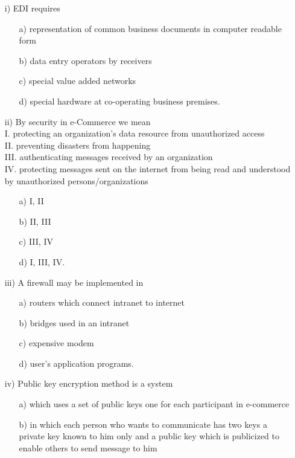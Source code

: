 \documentclass{article}
\begin{document}
\begin{enumerate}
    \item[i)] EDI requires
    \begin{enumerate}
        \item[a)] representation of common business documents in computer readable form
        \item[b)] data entry operators by receivers
        \item[c)] special value added networks
        \item[d)] special hardware at co-operating business premises.
    \end{enumerate}
    \item[ii)] By security in e-Commerce we mean \\
    I. protecting an organization's data resource from unauthorized access \\
    II. preventing disasters from happening \\
    III. authenticating messages received by an organization \\
    IV. protecting messages sent on the internet from being read and understood by unauthorized persons/organizations
    \begin{enumerate}
        \item[a)] I, II
        \item[b)] II, III
        \item[c)] III, IV
        \item[d)] I, III, IV.
    \end{enumerate}
    \item[iii)] A firewall may be implemented in
    \begin{enumerate}
        \item[a)] routers which connect intranet to internet
        \item[b)] bridges used in an intranet
        \item[c)] expensive modem
        \item[d)] user's application programs.
    \end{enumerate}
    \item[iv)] Public key encryption method is a system
    \begin{enumerate}
        \item[a)] which uses a set of public keys one for each participant in e-commerce
        \item[b)] in which each person who wants to communicate has two keys a private key known to him only and a public key which is publicized to enable others to send message to him

\end{enumerate}
\end{enumerate}
\end{document}
